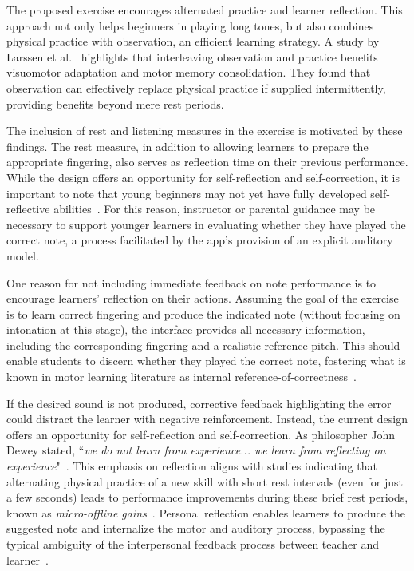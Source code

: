 \documentclass[runningheads]{llncs}
\begin{document}
The proposed exercise encourages alternated practice and learner reflection. This approach not only helps beginners in playing long tones, but also combines physical practice with observation, an efficient learning strategy. A study by Larssen et al.~\cite{Larssen21} highlights that interleaving observation and practice benefits visuomotor adaptation and motor memory consolidation. They found that observation can effectively replace physical practice if supplied intermittently, providing benefits beyond mere rest periods.

The inclusion of rest and listening measures in the exercise is motivated by these findings. The rest measure, in addition to allowing learners to prepare the appropriate fingering, also serves as reflection time on their previous performance. While the design offers an opportunity for self-reflection and self-correction, it is important to note that young beginners may not yet have fully developed self-reflective abilities~\cite{AdamsWebber99}. For this reason, instructor or parental guidance may be necessary to support younger learners in evaluating whether they have played the correct note, a process facilitated by the app’s provision of an explicit auditory model.

One reason for not including immediate feedback on note performance is to encourage learners' reflection on their actions. Assuming the goal of the exercise is to learn correct fingering and produce the indicated note (without focusing on intonation at this stage), the interface provides all necessary information, including the corresponding fingering and a realistic reference pitch. This should enable students to discern whether they played the correct note, fostering what is known in motor learning literature as internal reference-of-correctness~\cite{Maas08}.

If the desired sound is not produced, corrective feedback highlighting the error could distract the learner with negative reinforcement. Instead, the current design offers an opportunity for self-reflection and self-correction. As philosopher John Dewey stated, ``\textit{we do not learn from experience... we learn from reflecting on experience}"~\cite{Dewey38}. This emphasis on reflection aligns with studies indicating that alternating physical practice of a new skill with short rest intervals (even for just a few seconds) leads to performance improvements during these brief rest periods, known as \textit{micro-offline gains}~\cite{Bonstrup20}. Personal reflection enables learners to produce the suggested note and internalize the motor and auditory process, bypassing the typical ambiguity of the interpersonal feedback process between teacher and learner~\cite{Welch05}.
\end{document}
